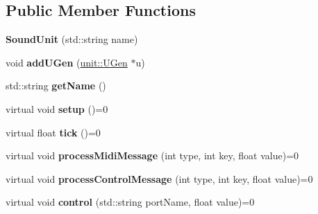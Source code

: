 \subsection*{Public Member Functions}
\begin{DoxyCompactItemize}
\item 
\hypertarget{classunit_1_1SoundUnit_a3220665fe1e433d1b0d90fa328e71133}{{\bfseries Sound\-Unit} (std\-::string name)}\label{classunit_1_1SoundUnit_a3220665fe1e433d1b0d90fa328e71133}

\item 
\hypertarget{classunit_1_1SoundUnit_a3c4fb09e94703dd7f7d17ca5cb7bb561}{void {\bfseries add\-U\-Gen} (\hyperlink{classunit_1_1UGen}{unit\-::\-U\-Gen} $\ast$u)}\label{classunit_1_1SoundUnit_a3c4fb09e94703dd7f7d17ca5cb7bb561}

\item 
\hypertarget{classunit_1_1SoundUnit_a4854dfb9b839ff33d061ed013fbf3ef9}{std\-::string {\bfseries get\-Name} ()}\label{classunit_1_1SoundUnit_a4854dfb9b839ff33d061ed013fbf3ef9}

\item 
\hypertarget{classunit_1_1SoundUnit_aedfa9b99f4555ed5df4ceffe001c1e63}{virtual void {\bfseries setup} ()=0}\label{classunit_1_1SoundUnit_aedfa9b99f4555ed5df4ceffe001c1e63}

\item 
\hypertarget{classunit_1_1SoundUnit_af1f6ccffb8d1919bd774b340c01bea68}{virtual float {\bfseries tick} ()=0}\label{classunit_1_1SoundUnit_af1f6ccffb8d1919bd774b340c01bea68}

\item 
\hypertarget{classunit_1_1SoundUnit_a1e73f915afac67a2103f8d79daf40ec3}{virtual void {\bfseries process\-Midi\-Message} (int type, int key, float value)=0}\label{classunit_1_1SoundUnit_a1e73f915afac67a2103f8d79daf40ec3}

\item 
\hypertarget{classunit_1_1SoundUnit_ad20e07c321b9d206f0f9303bbdf2a67d}{virtual void {\bfseries process\-Control\-Message} (int type, int key, float value)=0}\label{classunit_1_1SoundUnit_ad20e07c321b9d206f0f9303bbdf2a67d}

\item 
\hypertarget{classunit_1_1SoundUnit_a0a74ef3d6c9343f1ee64a9a96bdbbe78}{virtual void {\bfseries control} (std\-::string port\-Name, float value)=0}\label{classunit_1_1SoundUnit_a0a74ef3d6c9343f1ee64a9a96bdbbe78}

\end{DoxyCompactItemize}
